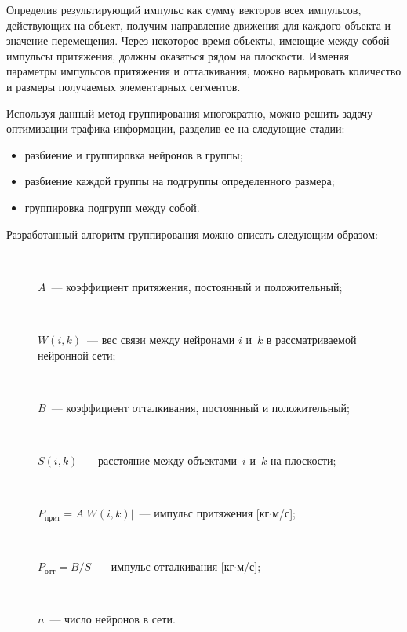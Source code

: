 \begin{multicols}{2}
\pagebreak
     
     Определив результирующий импульс как сумму векторов всех 
импульсов, действующих на объект, получим направление движения для 
каждого объекта и значение перемещения. Через некоторое время объекты, 
имеющие между собой импульсы притяжения, должны оказаться рядом на 
плос\-кости. Изменяя параметры импульсов притяжения и отталкивания, 
можно варьировать количество и размеры получаемых элементарных 
сегментов.
     
     Используя данный метод группирования многократно, можно решить 
задачу оптимизации трафика информации,  разделив ее на следующие 
стадии:
     \begin{itemize}
     \item разбиение и группировка  нейронов в группы;
     \item разбиение каждой группы на подгруппы определенного размера;
     \item группировка подгрупп между собой.
     \end{itemize}



     Разработанный алгоритм группирования можно описать следующим 
образом:
\begin{description}     
\item[\ ] $A$~--- коэффициент притяжения, постоянный и положительный;
\item[\ ]
$W(i,k)$~--- вес связи между нейронами $i$ и~$k$ в рассматриваемой 
нейронной сети;
\item[\ ]
$B$~--- коэффициент отталкивания, постоянный и положительный;
\item[\ ]
$S(i,k)$~--- расстояние между объектами~$i$ и~$k$ на плоскости;
\item[\ ]
$P_{\mathrm{прит}}=A\vert 
W(i,k)\vert$~--- импульс притяжения [кг$\cdot$м/с];
\item[\ ]
$P_{\mathrm{отт}}= B/S$~--- импульс отталкивания [кг$\cdot$м/с];
\item[\ ]
$n$~--- число нейронов в сети.
\end{description}
     

\end{multicols}
